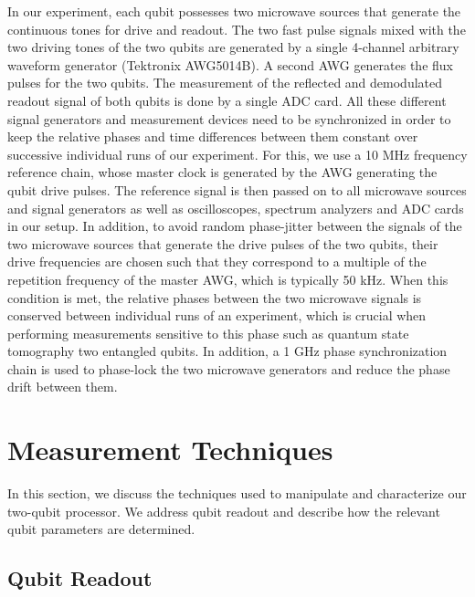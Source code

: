 In our experiment, each qubit possesses two microwave sources that generate the continuous tones for drive and readout. The two fast pulse signals mixed with the two driving tones of the two qubits are generated by a single 4-channel arbitrary waveform generator (Tektronix AWG5014B). A second AWG generates the flux pulses for the two qubits. The measurement of the reflected and demodulated readout signal of both qubits is done by a single ADC card. All these different signal generators and measurement devices need to be synchronized in order to keep the relative phases and time differences between them constant over successive individual runs of our experiment. For this, we use a 10 MHz frequency reference chain, whose master clock is generated by the AWG generating the qubit drive pulses. The reference signal is then passed on to all microwave sources and signal generators as well as oscilloscopes, spectrum analyzers and ADC cards in our setup. In addition, to avoid random phase-jitter between the signals of the two microwave sources that generate the drive pulses of the two qubits, their drive frequencies are chosen such that they correspond to a multiple of the repetition frequency of the master AWG, which is typically 50 kHz. When this condition is met, the relative phases between the two microwave signals is conserved between individual runs of an experiment, which is crucial when performing measurements sensitive to this phase such as quantum state tomography two entangled qubits. In addition, a 1 GHz phase synchronization chain is used to phase-lock the two microwave generators and reduce the phase drift between them.

\section{Measurement Techniques}

In this section, we discuss the techniques used to manipulate and characterize our two-qubit processor. We address qubit readout and describe how the relevant qubit parameters are determined.

\subsection{Qubit Readout} \label{section:qubit_readout}

